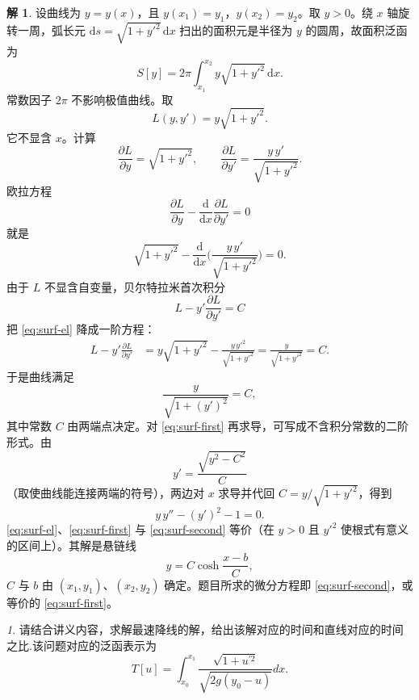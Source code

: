 \documentclass[11pt]{article}
\theoremstyle{remark}
\newtheorem{problem}{}
\theoremstyle{definition}
\newtheorem{solution}{解}
\begin{document}
\begin{solution}
设曲线为 $y=y(x)$，且 $y(x_1)=y_1$，$y(x_2)=y_2$。取 $y>0$。绕 $x$ 轴旋转一周，弧长元 $\mathrm{d}s=\sqrt{1+y'^2}\,\mathrm{d}x$ 扫出的面积元是半径为 $y$ 的圆周，故面积泛函为
\[
S[y]=2\pi\int_{x_1}^{x_2} y\sqrt{1+y'^2}\,\mathrm{d}x.
\]
常数因子 $2\pi$ 不影响极值曲线。取
\[
L(y,y')=y\sqrt{1+y'^2}.
\]
它不显含 $x$。计算
\[
\frac{\partial L}{\partial y}=\sqrt{1+y'^2},
\qquad
\frac{\partial L}{\partial y'}=\frac{y\,y'}{\sqrt{1+y'^2}}.
\]
欧拉方程
\[
\frac{\partial L}{\partial y}-\frac{\mathrm{d}}{\mathrm{d}x}\frac{\partial L}{\partial y'}=0
\]
就是
\begin{equation}
\sqrt{1+y'^2}
-\frac{\mathrm{d}}{\mathrm{d}x}\Biggl(\frac{y\,y'}{\sqrt{1+y'^2}}\Biggr)=0.
\label{eq:surf-el}
\end{equation}
由于 $L$ 不显含自变量，贝尔特拉米首次积分
\[
L-y'\frac{\partial L}{\partial y'}=C
\]
把 \eqref{eq:surf-el} 降成一阶方程：
\begin{align*}
L-y'\frac{\partial L}{\partial y'}
&=y\sqrt{1+y'^2}-\frac{y\,y'^2}{\sqrt{1+y'^2}}
=\frac{y}{\sqrt{1+y'^2}}=C.
\end{align*}
于是曲线满足
\begin{equation}
\frac{y}{\sqrt{1+(y')^2}}=C,
\label{eq:surf-first}
\end{equation}
其中常数 $C$ 由两端点决定。对 \eqref{eq:surf-first} 再求导，可写成不含积分常数的二阶形式。由
\[
y'= \frac{\sqrt{y^2-C^2}}{C}
\]
（取使曲线能连接两端的符号），两边对 $x$ 求导并代回 $C=y/\sqrt{1+y'^2}$，得到
\begin{equation}
y\,y''-(y')^2-1=0.
\label{eq:surf-second}
\end{equation}
\eqref{eq:surf-el}、\eqref{eq:surf-first} 与 \eqref{eq:surf-second} 等价（在 $y>0$ 且 $y'^2$ 使根式有意义的区间上）。其解是悬链线
\[
y=C\cosh\frac{x-b}{C},
\]
$C$ 与 $b$ 由 $(x_1,y_1)$、$(x_2,y_2)$ 确定。题目所求的微分方程即 \eqref{eq:surf-second}，或等价的 \eqref{eq:surf-first}。
\end{solution}

\begin{problem}
  请结合讲义内容，求解最速降线的解，给出该解对应的时间和直线对应的时间之比.该问题对应的泛函表示为
  $$
  T[u] = \int_{x_0}^{x_1} \frac{\sqrt{1+u^{\prime 2}}}{\sqrt{2 g\left(y_0-u\right)}} d x .
  $$
\end{problem}
\end{document}
